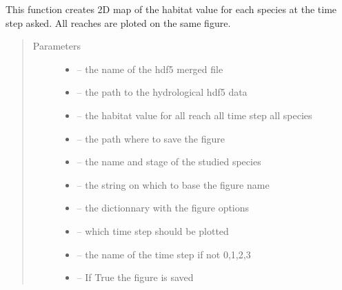\documentclass[letterpaper,10pt,english]{sphinxmanual}
\begin{document}
\begin{fulllineitems}
\label{\detokenize{index:src.calcul_hab.save_vh_fig_2d}}
This function creates 2D map of the habitat value for each species at
the time step asked. All reaches are ploted on the same figure.
\begin{quote}\begin{description}
\item[{Parameters}] \leavevmode\begin{itemize}
\item {} 
 -- the name of the hdf5 merged file

\item {} 
 -- the path to the hydrological hdf5 data

\item {} 
 -- the habitat value for all reach all time step all species

\item {} 
 -- the path where to save the figure

\item {} 
 -- the name and stage of the studied species

\item {} 
 -- the string on which to base the figure name

\item {} 
 -- the dictionnary with the figure options

\item {} 
 -- which time step should be plotted

\item {} 
 -- the name of the time step if not 0,1,2,3

\item {} 
 -- If True the figure is saved

\end{itemize}

\end{description}\end{quote}

\end{fulllineitems}
\end{document}
